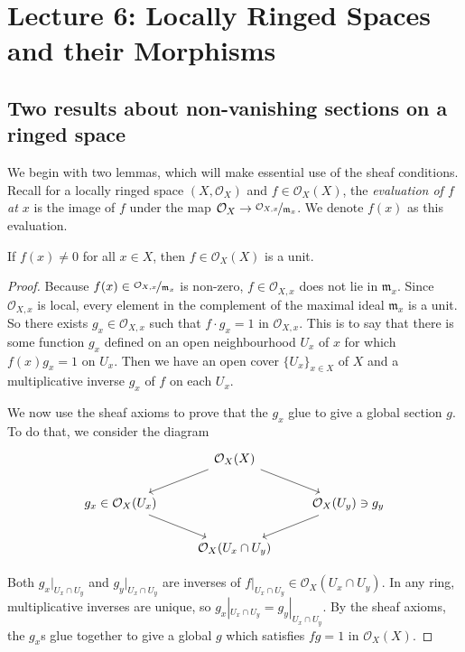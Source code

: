 \newpage

\section*{Lecture 6: Locally Ringed Spaces and their Morphisms}

\subsection{Two results about non-vanishing sections on a ringed space}

We begin with two lemmas, which will make essential use of the sheaf conditions. Recall for a locally ringed space $(X,\mathcal{O}_X)$ and $f \in \mathcal{O}_X(X)$,  the \textit{evaluation of $f$ at $x$} is the image of $f$ under the map $\mathcal{O}_X \to \nicefrac{\mathcal{O}_{X,x}}{\mathfrak{m}_x}$. We denote $f(x)$ as this evaluation.

\begin{theorem}
If $f(x) \ne 0$ for all $x \in X$, then $f \in \mathcal{O}_X(X)$ is a unit. 
\end{theorem}

\begin{proof}
  Because $f(x) \in \nicefrac{\mathcal{O}_{X,x}}{\mathfrak{m}_x}$ is non-zero, \(f \in \mathcal{O}_{X,x}\) does not lie in \(\mathfrak m_x\).
  Since \(\mathcal{O}_{X,x}\) is local, every element in the complement of the maximal ideal \(\mathfrak m_x\) is a unit.
  So there exists \(g_x \in \mathcal{O}_{X,x}\) such that \(f \cdot g_x = 1\) in \(\mathcal{O}_{X,x}\).
  This is to say that there is some function $g_x$ defined on an open neighbourhood $U_x$ of $x$ for which $f(x)g_x = 1$ on \(U_x\). Then we have an open cover $\{U_x\}_{x \in X}$ of $X$ and a multiplicative inverse \(g_x\) of \(f\) on each \(U_x\).

  We now use the sheaf axioms to prove that the \(g_x\) glue to give a global section \(g\).
  To do that, we consider the diagram
\begin{equation}
\begin{tikzcd}
& \mathcal{O}_X(X) \arrow[dl] \arrow[dr] &\\
g_x \in \mathcal{O}_X(U_x) \arrow[dr]&  & \mathcal{O}_X(U_y) \owns g_y\arrow[dl]\\
& \mathcal{O}_X(U_x \cap U_y)&
\end{tikzcd}
\end{equation}

Both $g_x|_{U_{x} \cap U_{y}}$ and $g_y|_{U_{x} \cap U_{y}}$ are inverses of $f|_{U_{x} \cap U_{y}} \in \mathcal{O}_X(U_x \cap U_y)$.
In any ring,  multiplicative inverses are unique, so $g_x|_{U_{x} \cap U_{y}} = g_y|_{U_{x} \cap U_{y}}$. 
By the sheaf axioms, the $g_x$s glue together to give a global $g$ which satisfies $fg = 1$ in $\mathcal{O}_X(X)$.
\end{proof}

